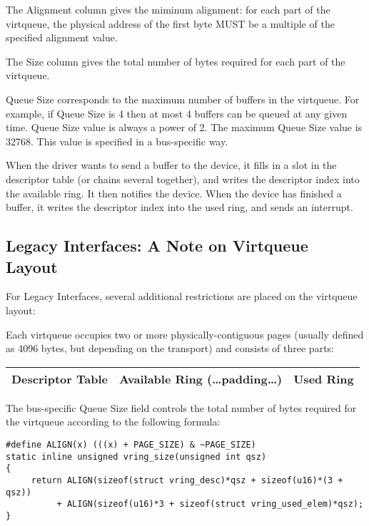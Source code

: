 The Alignment column gives the miminum alignment: for each part
of the virtqueue, the physical address of the first byte
MUST be a multiple of the specified alignment value.

The Size column gives the total number of bytes required for each
part of the virtqueue.

Queue Size corresponds to the maximum number of buffers in the
virtqueue.  For example, if Queue Size is 4 then at most 4 buffers
can be queued at any given time.  Queue Size value is always a
power of 2.  The maximum Queue Size value is 32768.  This value
is specified in a bus-specific way.

When the driver wants to send a buffer to the device, it fills in
a slot in the descriptor table (or chains several together), and
writes the descriptor index into the available ring.  It then
notifies the device. When the device has finished a buffer, it
writes the descriptor index into the used ring, and sends an interrupt.


\subsection{Legacy Interfaces: A Note on Virtqueue Layout}\label{sec:Basic Facilities of a Virtio Device / Virtqueues / Legacy Interfaces: A Note on Virtqueue Layout}

For Legacy Interfaces, several additional
restrictions are placed on the virtqueue layout:

Each virtqueue occupies two or more physically-contiguous pages
(usually defined as 4096 bytes, but depending on the transport)
and consists of three parts:

\begin{tabular}{|l|l|l|}
\hline
Descriptor Table & Available Ring (\ldots padding\ldots) & Used Ring \\
\hline
\end{tabular}

The bus-specific Queue Size field controls the total number of bytes
required for the virtqueue according to the following formula:

\begin{lstlisting}
#define ALIGN(x) (((x) + PAGE_SIZE) & ~PAGE_SIZE)
static inline unsigned vring_size(unsigned int qsz)
{
     return ALIGN(sizeof(struct vring_desc)*qsz + sizeof(u16)*(3 + qsz))
          + ALIGN(sizeof(u16)*3 + sizeof(struct vring_used_elem)*qsz);
}
\end{lstlisting}

